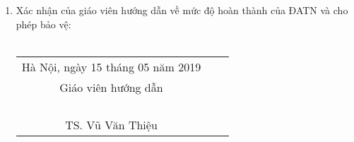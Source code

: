 \begin{dedication}
\begin{enumerate}
\begin{tabu} {c c c c}
  	
  		\end{tabu}
  
  \item Xác nhận của giáo viên hướng dẫn về mức độ hoàn thành của ĐATN và cho phép bảo vệ:\\
  	\\
		\begin{tabu} {c c c}
  	
  		 	\hspace{60mm} Hà Nội, ngày 15 tháng 05 năm 2019\\
  			\hspace{70mm} Giáo viên hướng dẫn\\
  			\\
  			\\
  			\\
  			\\
  			\hspace{70mm} TS. Vũ Văn Thiệu\\
  	
  	
  		\end{tabu}

  \end{enumerate}
	  
  
\end{dedication}